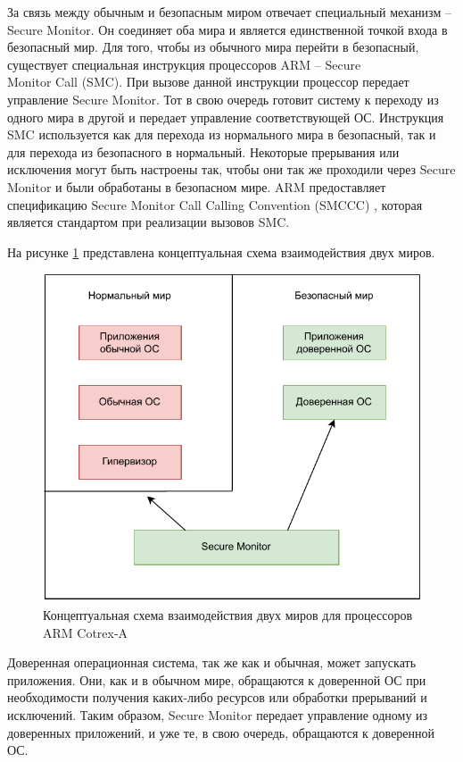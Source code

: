 За связь между обычным и безопасным миром отвечает специальный механизм -- Secure Monitor. Он соединяет оба мира и является единственной точкой входа в безопасный мир. Для того, чтобы из обычного мира перейти в безопасный, существует специальная инструкция процессоров ARM -- Secure\\Monitor Call (SMC). При вызове данной инструкции процессор передает управление Secure Monitor. Тот в свою очередь готовит систему к переходу из одного мира в другой и передает управление соответствующей ОС. Инструкция SMC используется как для перехода из нормального мира в безопасный, так и для перехода из безопасного в нормальный. Некоторые прерывания или исключения могут быть настроены так, чтобы они так же проходили через Secure Monitor и были обработаны в безопасном мире. ARM предоставляет спецификацию Secure Monitor Call Calling Convention (SMCCC) \cite{smccc}, которая является стандартом при реализации вызовов SMC. 

На рисунке \ref{fig:trustzone-conceptual} представлена концептуальная схема взаимодействия двух миров.

\begin{figure}[h]
	\centering
	\includegraphics[width=\textwidth]{img/arm-conceptual.pdf}
	\caption{Концептуальная схема взаимодействия двух миров для процессоров ARM Cotrex-A}
	\label{fig:trustzone-conceptual}
\end{figure}

Доверенная операционная система, так же как и обычная, может запускать приложения. Они, как и в обычном мире, обращаются к доверенной ОС при необходимости получения каких-либо ресурсов или обработки прерываний и исключений. Таким образом, Secure Monitor передает управление одному из доверенных приложений, и уже те, в свою очередь, обращаются к доверенной ОС.

